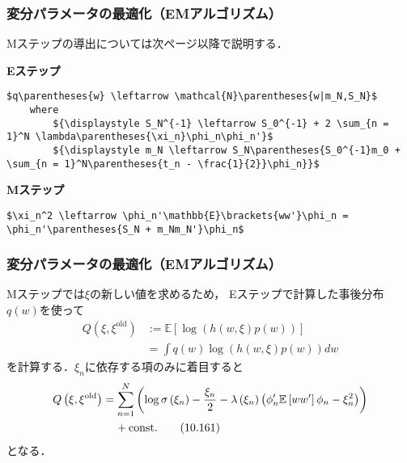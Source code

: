 \documentclass[10pt,usepdftitle=false,hyperref={unicode}]{beamer}
\newcommand{\parentheses}[1]{\left(#1\right)}
\newcommand{\brackets}[1]{\left[#1\right]}
\begin{document}
\begin{frame}[fragile]
\frametitle{変分パラメータの最適化（EMアルゴリズム）}
Mステップの導出については次ページ以降で説明する．

\bigskip

\textbf{Eステップ}
\begin{lstlisting}[mathescape,lineskip={5pt}]
    $q\parentheses{w} \leftarrow \mathcal{N}\parentheses{w|m_N,S_N}$
    where
        ${\displaystyle S_N^{-1} \leftarrow S_0^{-1} + 2 \sum_{n = 1}^N \lambda\parentheses{\xi_n}\phi_n\phi_n'}$
        ${\displaystyle m_N \leftarrow S_N\parentheses{S_0^{-1}m_0 + \sum_{n = 1}^N\parentheses{t_n - \frac{1}{2}}\phi_n}}$
\end{lstlisting}

\smallskip

\textbf{Mステップ}
\begin{lstlisting}[mathescape,lineskip={5pt}]
    $\xi_n^2 \leftarrow \phi_n'\mathbb{E}\brackets{ww'}\phi_n = \phi_n'\parentheses{S_N + m_Nm_N'}\phi_n$
\end{lstlisting}

\end{frame}

\begin{frame}
\frametitle{変分パラメータの最適化（EMアルゴリズム）}
Mステップでは$\xi$の新しい値を求めるため，
Eステップで計算した事後分布$q\parentheses{w}$を使って
\begin{align*}
    Q\parentheses{\xi,\xi^{\mathrm{old}}}
    &:= \mathbb{E}\brackets{\log\parentheses{h\parentheses{w,\xi}p\parentheses{w}}} \\
    &= \int q\parentheses{w} \log \parentheses{h\parentheses{w,\xi}p\parentheses{w}}dw
\end{align*}
を計算する．$\xi_n$に依存する項のみに着目すると
\begin{align}
    Q\parentheses{\xi,\xi^{\mathrm{old}}}
    &= \sum_{n = 1}^N \parentheses{\log \sigma\parentheses{\xi_n} - \frac{\xi_n}{2} - \lambda\parentheses{\xi_n}
            \parentheses{\phi_n'\mathbb{E}\brackets{ww'}\phi_n - \xi_n^2}} \notag \\
    &\phantom{=}\ + \mathrm{const.} \tag{10.161}
\end{align}
となる．
\end{frame}
\end{document}
